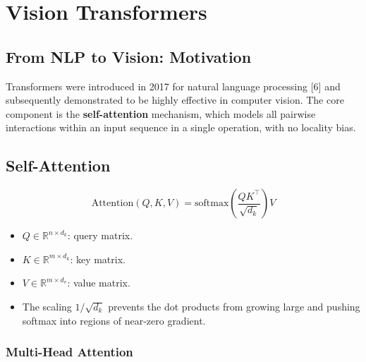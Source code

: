 \documentclass[12pt,a4paper]{report}
\begin{document}
\setcounter{chapter}{11}   %

\chapter{Vision Transformers}

\section{From NLP to Vision: Motivation}

Transformers were introduced in 2017 for natural language processing
[6] and subsequently demonstrated to be highly
effective in computer vision.  The core component is the
\textbf{self-attention} mechanism, which models all pairwise interactions
within an input sequence in a single operation, with no locality bias.

\section{Self-Attention}

\begin{formulabox}
\[
    \mathrm{Attention}(Q,K,V)
    = \mathrm{softmax}\!\left(\frac{QK^\top}{\sqrt{d_k}}\right)V
\]
\begin{itemize}[itemsep=1pt]
    \item $Q \in \mathbb{R}^{n\times d_k}$: query matrix.
    \item $K \in \mathbb{R}^{m\times d_k}$: key matrix.
    \item $V \in \mathbb{R}^{m\times d_v}$: value matrix.
    \item The scaling $1/\sqrt{d_k}$ prevents the dot products from growing
          large and pushing softmax into regions of near-zero gradient.
\end{itemize}
\end{formulabox}

\subsection{Multi-Head Attention}
\end{document}

